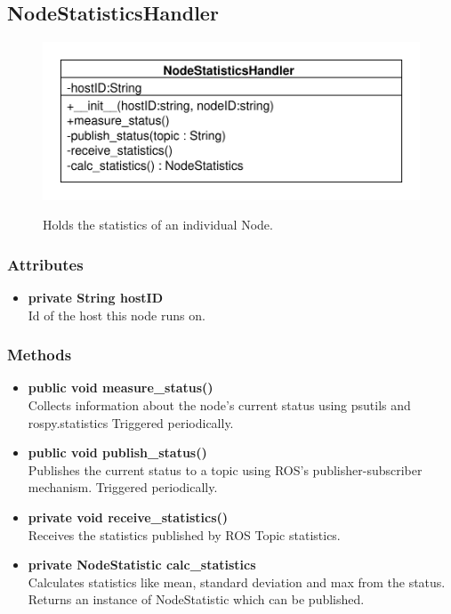 \subsection{NodeStatisticsHandler}
\begin{figure}[htbp]
	\begin{minipage}[t]{7cm}
		\vspace{0pt}
		\centering
		\includegraphics[scale=0.6]{./diagram_pictures/NodeInterface/NodeStatisticsHandler.pdf}
	\end{minipage}
	\hfill
	\begin{minipage}[t]{6cm}
		\vspace{10pt}
		Holds the statistics of an individual Node.
	\end{minipage}
\end{figure}


\subsubsection{Attributes}
\begin{itemize}
	\item \textbf{private String hostID}\\
	Id of the host this node runs on.
\end{itemize}

\subsubsection{Methods}
\begin{itemize}
	\item \textbf{public void measure\_status()}\\
	Collects information about the node's current status using psutils and rospy.statistics
	Triggered periodically.
	\item \textbf{public void publish\_status()}\\
	Publishes the current status to a topic using ROS's publisher-subscriber mechanism.
	Triggered periodically.
	\item \textbf{private void receive\_statistics()}\\
	Receives the statistics published by ROS Topic statistics.
	\item \textbf{private NodeStatistic calc\_statistics}\\
	Calculates statistics like mean, standard deviation and max from the status.
	Returns an instance of NodeStatistic which can be published.
\end{itemize}

